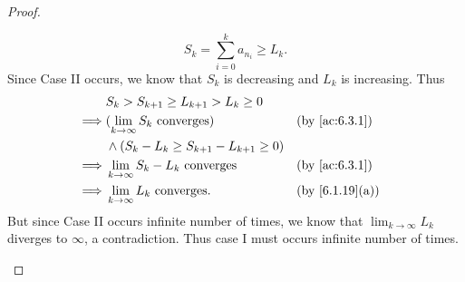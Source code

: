 \begin{proof}
\begin{itemize}
\[            S_k = \sum_{i = 0}^k a_{n_i} \geq L_k.
          \]
          Since Case II occurs, we know that \(S_k\) is decreasing and \(L_k\) is increasing.
          Thus
          \begin{align*}
                     & S_k > S_{k + 1} \geq L_{k + 1} > L_k \geq 0                                           \\
            \implies & (\lim_{k \to \infty} S_k \text{ converges})         &  & \by{ac:6.3.1}                \\
                     & \land (S_k - L_k \geq S_{k + 1} - L_{k + 1} \geq 0)                                   \\
            \implies & \lim_{k \to \infty} S_k - L_k \text{ converges}     &  & \by{ac:6.3.1}                \\
            \implies & \lim_{k \to \infty} L_k \text{ converges}.          &  & \text{(by \cref{6.1.19}(a))}
          \end{align*}
          But since Case II occurs infinite number of times, we know that \(\lim_{k \to \infty} L_k\) diverges to \(\infty\), a contradiction.
          Thus case I must occurs infinite number of times.


\end{itemize}
\end{proof}
